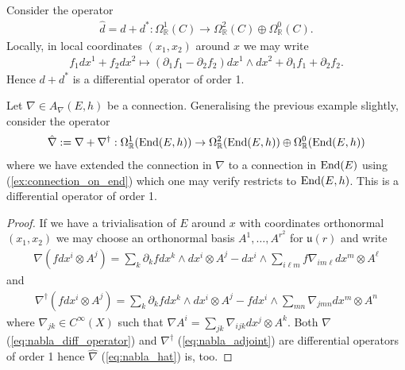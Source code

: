\documentclass[12pt]{ociamthesis}  %
\begin{document}
\begin{example}
  Consider the operator
  \begin{align}\label{eq:d_hat}
    \hat d = d + d^* : \Omega^1_{\mathbb R}(C) \to \Omega^2_{\mathbb R}(C) \oplus \Omega^0_{\mathbb R}(C).
  \end{align}
  Locally, in local coordinates $(x_1,x_2)$ around $x$ we may write
  \begin{align*}
    f_1 dx^1 + f_2 dx^2 \mapsto
    (\partial_1 f_1 - \partial_2 f_2)dx^1\wedge dx^2
    + \partial_1 f_1 + \partial_2 f_2 .
  \end{align*}
  Hence $d + d^*$ is a differential operator of order 1.
\end{example}

\begin{example}
  Let $\nabla\in A_\nabla(E,h)$ be a connection. Generalising the previous
  example slightly, consider the operator
  \begin{align}\label{eq:nabla_hat}
    \hat\nabla := \nabla + \nabla^\dagger :
    \Omega^1_{\mathbb R}(\operatorname{End}(E,h)) \to
    \Omega^2_{\mathbb R}(\operatorname{End}(E,h)) \oplus
    \Omega^0_{\mathbb R}(\operatorname{End}(E,h))
  \end{align}
  where we have extended the connection in $\nabla$ to a connection
  in $\operatorname{End}(E)$ using (\ref{ex:connection_on_end}) which
  one may verify restricts to $\operatorname{End}(E,h)$. This is a
  differential operator of order 1.
  \begin{proof}
    If we have a trivialisation of $E$ around $x$ with coordinates orthonormal
    $(x_1,x_2)$ we may choose an orthonormal basis $A^1,\ldots,A^{r^2}$ for
    $\mathfrak u(r)$ and write
    \begin{align}\label{eq:nabla_diff_operator}
      \nabla\left(fdx^i\otimes A^j\right)
      = \sum_k \partial_k f dx^k\wedge dx^i \otimes A^j
      - dx^i\wedge\sum_{i\ell m} f\nabla_{im\ell}dx^m\otimes A^\ell
    \end{align}
    and
    \begin{align}\label{eq:nabla_adjoint}
      \nabla^\dagger\left(fdx^i \otimes A^j\right)
      = \sum_k \partial_k fdx^k\wedge dx^i\otimes A^j
      - fdx^i \wedge \sum_{mn} \nabla_{jmn}dx^m\otimes A^n
    \end{align}
    where $\nabla_{jk}\in C^\infty(X)$ such that
    $\nabla A^i = \sum_{jk}\nabla_{ijk}dx^j\otimes A^k$. Both
    $\nabla$ (\ref{eq:nabla_diff_operator}) and $\nabla^\dagger$
    (\ref{eq:nabla_adjoint}) are differential operators of order 1 hence
    $\hat\nabla$ (\ref{eq:nabla_hat}) is, too.
  \end{proof}
\end{example}
\end{document}
